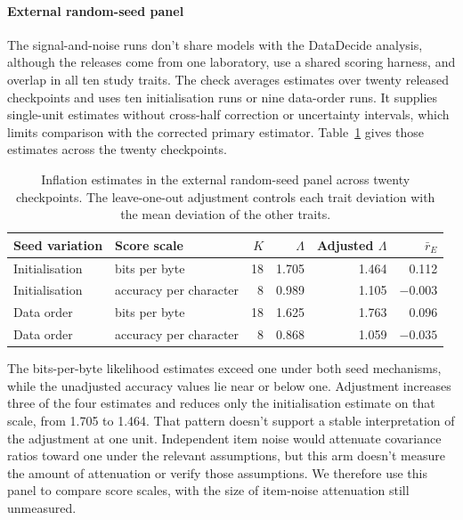 \paragraph{External random-seed panel}
The signal-and-noise runs don't share models with the DataDecide analysis, although the releases come from one laboratory, use a shared scoring harness, and overlap in all ten study traits. The check averages estimates over twenty released checkpoints and uses ten initialisation runs or nine data-order runs. It supplies single-unit estimates without cross-half correction or uncertainty intervals, which limits comparison with the corrected primary estimator. Table~\ref{tab:original12} gives those estimates across the twenty checkpoints.

\begin{table}[!htb]
\centering
\caption{Inflation estimates in the external random-seed panel across twenty checkpoints. The leave-one-out adjustment controls each trait deviation with the mean deviation of the other traits.}
\label{tab:original12}
\small\setlength{\tabcolsep}{4pt}\renewcommand{\arraystretch}{1.12}
\begin{tabular}{llrrrr}\toprule
Seed variation & Score scale & $K$ & $\Lambda$ & Adjusted $\Lambda$ & $\bar r_E$\\\midrule
Initialisation & bits per byte & 18 & 1.705 & 1.464 & 0.112\\
Initialisation & accuracy per character & 8 & 0.989 & 1.105 & $-0.003$\\
Data order & bits per byte & 18 & 1.625 & 1.763 & 0.096\\
Data order & accuracy per character & 8 & 0.868 & 1.059 & $-0.035$\\\bottomrule
\end{tabular}
\end{table}

The bits-per-byte likelihood estimates exceed one under both seed mechanisms, while the unadjusted accuracy values lie near or below one. Adjustment increases three of the four estimates and reduces only the initialisation estimate on that scale, from 1.705 to 1.464. That pattern doesn't support a stable interpretation of the adjustment at one unit. Independent item noise would attenuate covariance ratios toward one under the relevant assumptions, but this arm doesn't measure the amount of attenuation or verify those assumptions. We therefore use this panel to compare score scales, with the size of item-noise attenuation still unmeasured.

